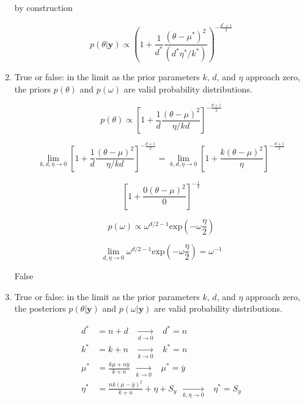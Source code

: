 \documentclass[10pt]{article}
\newcommand{\by}{\mathbf{y}}
\begin{document}
\begin{enumerate}[label=(\Alph*)]
        by construction

        $$p(\theta | \by) \propto \left ( 1 + \frac{1}{d^*} \frac{(\theta - \mu^*)^2}{(d^* \eta^* / k^*)}\right)^{- \frac{d^*+1}{2}}$$

      \item True or false: in the limit as the prior parameters $k$, $d$, and $\eta$ approach zero, the priors $p(\theta)$ and $p(\omega)$ are valid probability distributions.

        $$p(\theta) \propto \left[ 1 + \frac{1}{d} \frac{(\theta - \mu)^2}{\eta/kd}\right]^{-\frac{d+1}{2}}$$

        $$\lim_{k,d,\eta \to 0} \left[ 1 + \frac{1}{d} \frac{(\theta - \mu)^2}{\eta/kd}\right]^{-\frac{d+1}{2}} = \lim_{k,d,\eta \to 0} \left[ 1 + \frac{k (\theta - \mu)^2}{\eta}\right]^{-\frac{d+1}{2}}$$

        $$\left[ 1 + \frac{0 (\theta - \mu)^2}{0}\right]^{-\frac{1}{2}}$$

        $$p(\omega) \propto \omega^{d/2-1} \text{exp}\left( -\omega \frac{\eta}{2}\right)$$

        $$\lim_{d, \eta \to 0} \omega^{d/2-1} \text{exp}\left( -\omega \frac{\eta}{2}\right) = \omega^{-1}$$

      False

      \item True or false: in the limit as the prior parameters $k$, $d$, and $\eta$ approach zero, the posteriors $p(\theta | \by)$ and $p(\omega | \by)$ are valid probability distributions.

        \begin{align*}
          d^* &= n+d \hspace{10pt}\xrightarrow[d\to0]{} \hspace{10pt} d^* = n \\
          k^* &= k+n \hspace{10pt}\xrightarrow[k\to0]{} \hspace{10pt} k^* = n \\
          \mu^* &= \frac{k\mu + n \bar{y}}{k+n} \hspace{5pt}\xrightarrow[k\to0]{} \hspace{10pt} \mu^* = \bar{y} \\
          \eta^* &= \frac{nk (\mu- \bar{y})^2}{k+n} + \eta + S_y \hspace{5pt}\xrightarrow[k,\eta\to0]{} \hspace{10pt} \eta^* = S_y \\
        \end{align*}


\end{enumerate}
\end{document}
